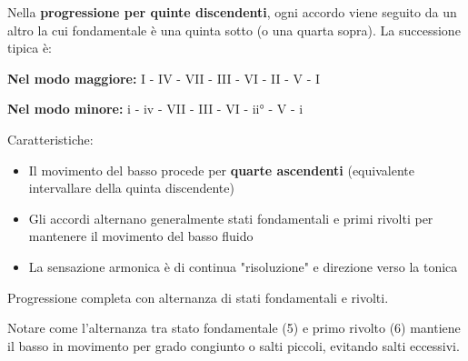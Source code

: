 \begin{regola}
	\label{reg:progressione_quinte_disc}
	Nella \textbf{progressione per quinte discendenti}, ogni accordo viene seguito da un altro la cui fondamentale è una quinta sotto (o una quarta sopra). La successione tipica è:
	
	\textbf{Nel modo maggiore:}
	I - IV - VII - III - VI - II - V - I
	
	\textbf{Nel modo minore:}
	i - iv - VII - III - VI - ii° - V - i
	
	Caratteristiche:
	\begin{itemize}
		\item Il movimento del basso procede per \textbf{quarte ascendenti} (equivalente intervallare della quinta discendente)
		\item Gli accordi alternano generalmente stati fondamentali e primi rivolti per mantenere il movimento del basso fluido
		\item La sensazione armonica è di continua "risoluzione" e direzione verso la tonica
	\end{itemize}
\end{regola}

\begin{esempio}
	\label{ex:progressione_quinte_disc}
	Progressione completa con alternanza di stati fondamentali e rivolti.
	
	Notare come l'alternanza tra stato fondamentale (5) e primo rivolto (6) mantiene il basso in movimento per grado congiunto o salti piccoli, evitando salti eccessivi.
\end{esempio}

